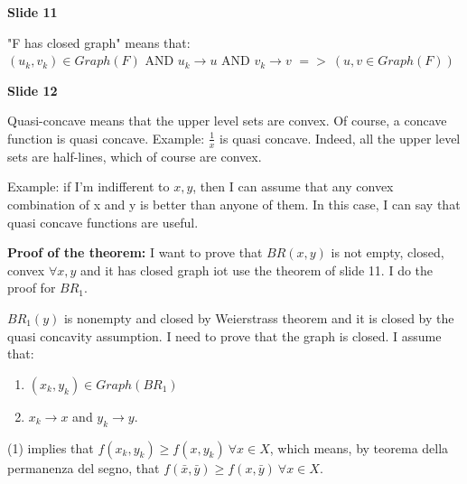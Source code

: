 \bigskip
\noindent \textbf{Slide 11}

\noindent "F has closed graph" means that:\\
$(u_k,v_k) \in Graph(F)$ AND 
$u_k \rightarrow u$ AND 
$v_k \rightarrow v$ 
$=> ~(u,v \in Graph(F))$

\bigskip
\noindent \textbf{Slide 12}

\noindent Quasi-concave means that the upper level sets are convex. Of 
course, a concave function is quasi concave. Example: $\frac{1}{x}$ is 
quasi concave. Indeed, all the upper level sets are half-lines, which of 
course are convex.

\noindent Example: if I'm indifferent to $x,y$, then I can assume that any 
convex combination of x and y is better than anyone of them. In this case, 
I can say that quasi concave functions are useful.

\noindent \textbf{Proof of the theorem:} I want to prove that $BR(x,y)$ is 
not empty, closed, convex $\forall x,y$ and it has closed graph iot use 
the theorem of slide 11. I do the proof for $BR_1$.

\noindent $BR_1(y)$ is nonempty and closed by Weierstrass theorem and 
it is closed by the quasi concavity assumption. I need to prove that 
the graph is closed. I assume that:
\begin{enumerate}
	\item $(x_k,y_k) \in Graph(BR_1)$
	\item $x_k \rightarrow x$ and $y_k \rightarrow y$.
\end{enumerate}

(1) implies that $f(x_k,y_k) \geq f(x,y_k) ~\forall x \in X$, which means, 
by teorema della permanenza del segno, that $f(\bar{x},\bar{y}) \geq 
f(x,\bar{y}) ~\forall x \in X$.

%
